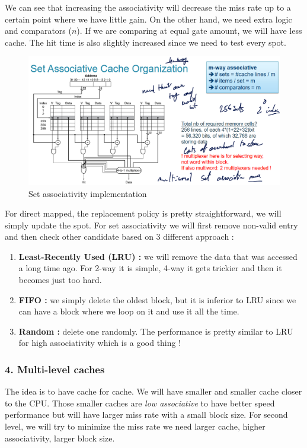 \documentclass{report}
\begin{document}
We can see that increasing the associativity will decrease the miss rate up to a certain point where we have little gain. On the other hand, we need extra logic and comparators ($n$). If we are comparing at equal gate amount, we will have less cache. The hit time is also slightly increased since we need to test every spot.

\begin{figure}[H]
    \centering
    \includegraphics[width=0.75\linewidth]{set_associative.png}
    \caption{Set associativity implementation}
    \label{fig:set-associativity-impl-label}
\end{figure}

For direct mapped, the replacement policy is pretty straightforward, we will simply update the spot. For set associativity we will first remove non-valid entry and then check other candidate based on 3 different approach : 

\begin{enumerate}
    \item \textbf{Least-Recently Used (LRU) :} we will remove the data that was accessed a long time ago. For 2-way it is simple, 4-way it gets trickier and then it becomes just too hard.
    \item \textbf{FIFO :} we simply delete the oldest block, but it is inferior to LRU since we can have a block where we loop on it and use it all the time.
    \item \textbf{Random :} delete one randomly. The performance is pretty similar to LRU for high associativity which is a good thing !
\end{enumerate}

\subsubsection{4. Multi-level caches}

The idea is to have cache for cache. We will have smaller and smaller cache closer to the CPU. Those smaller caches are \textit{low associative} to have better speed performance but will have larger miss rate with a small block size. For second level, we will try to minimize the miss rate we need larger cache, higher associativity, larger block size.
\end{document}
